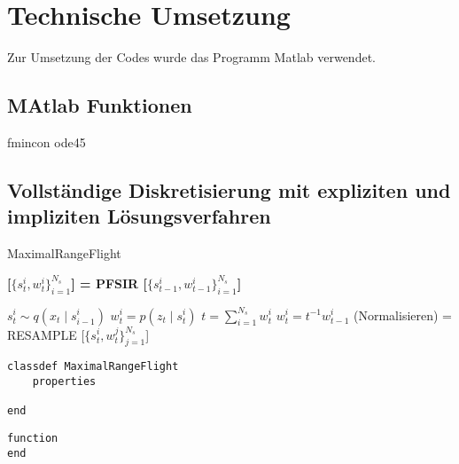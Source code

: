 \chapter{Technische Umsetzung}

Zur Umsetzung der Codes wurde das Programm Matlab verwendet.

\section{MAtlab Funktionen}
fmincon
ode45

\section{Vollständige Diskretisierung mit expliziten und impliziten Lösungsverfahren}

\begin{algorithm}[H]
\caption{MaximalRangeFlight}\label{algo:SISPF}
\textbf{[$\lbrace s^i_t, w^i_t \rbrace^{N_s}_{i=1}$] = PFSIR [$\lbrace s^i_{t-1}, w^i_{t-1} \rbrace^{N_s}_{i=1}$]}
\begin{algorithmic}
\STATE $s^i_t \sim q(x_t \mid s^i_{i-1})$
\STATE $w^i_t = p(z_t \mid s^i_t)$
\ENDFOR
\STATE $t = \sum_{i=1}^{N_s} w^i_t$
\STATE $w^i_t = t^{-1} w^i_{t-1}$ (Normalisieren)
\ENDFOR
\STATE [$\lbrace s^{\ast j}_t, w^{j}_t, i^{j} \rbrace^{N_s}_{j=1}$] = RESAMPLE [$\lbrace s^i_t, w^{j}_t \rbrace^{N_s}_{j=1}$]
\end{algorithmic}

\begin{lstlisting}
classdef MaximalRangeFlight
    properties
        
end
\end{lstlisting}

\end{algorithm}

\begin{lstlisting}
function 
end
\end{lstlisting}
